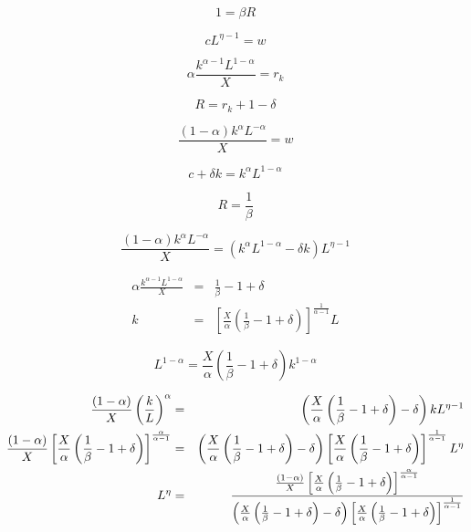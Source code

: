 \documentclass{article}
\begin{document}
\[
1=\beta R
\]

\[
cL^{\eta -1}=w
\]

\[
\alpha \frac{k^{\alpha -1}L^{1-\alpha }}{X}=r_{k}
\]

\[
R=r_{k}+1-\delta 
\]

\[
\frac{\left( 1-\alpha \right) k^{\alpha }L^{-\alpha }}{X}=w
\]

\[
c+\delta k=k^{\alpha }L^{1-\alpha }
\]

\bigskip 

\bigskip 
\[
R=\frac{1}{\beta }
\]

\[
\frac{\left( 1-\alpha \right) k^{\alpha }L^{-\alpha }}{X}=\left( k^{\alpha
}L^{1-\alpha }-\delta k\right) L^{\eta -1}
\]

\begin{eqnarray*}
\alpha \frac{k^{\alpha -1}L^{1-\alpha }}{X} &=&\frac{1}{\beta }-1+\delta  \\
k &=&\left[ \frac{X}{\alpha }\left( \frac{1}{\beta }-1+\delta \right) \right]
^{\frac{1}{\alpha -1}}L
\end{eqnarray*}

\[
L^{1-\alpha }=\frac{X}{\alpha }\left( \frac{1}{\beta }-1+\delta \right)
k^{1-\alpha }
\]

\bigskip 

\begin{eqnarray*}
\frac{\left( 1-\alpha \right) }{X}\left( \frac{k}{L}\right) ^{\alpha }
&=&\left( \frac{X}{\alpha }\left( \frac{1}{\beta }-1+\delta \right) -\delta
\right) kL^{\eta -1} \\
\frac{\left( 1-\alpha \right) }{X}\left[ \frac{X}{\alpha }\left( \frac{1}{%
\beta }-1+\delta \right) \right] ^{\frac{\alpha }{\alpha -1}} &=&\left( 
\frac{X}{\alpha }\left( \frac{1}{\beta }-1+\delta \right) -\delta \right) %
\left[ \frac{X}{\alpha }\left( \frac{1}{\beta }-1+\delta \right) \right] ^{%
\frac{1}{\alpha -1}}L^{\eta } \\
L^{\eta } &=&\frac{\frac{\left( 1-\alpha \right) }{X}\left[ \frac{X}{\alpha }%
\left( \frac{1}{\beta }-1+\delta \right) \right] ^{\frac{\alpha }{\alpha -1}}%
}{\left( \frac{X}{\alpha }\left( \frac{1}{\beta }-1+\delta \right) -\delta
\right) \left[ \frac{X}{\alpha }\left( \frac{1}{\beta }-1+\delta \right) %
\right] ^{\frac{1}{\alpha -1}}}
\end{eqnarray*}
\end{document}
